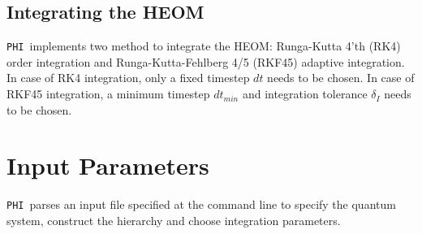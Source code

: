 \documentclass[11pt]{article}
\newcommand{\PHI}{\texttt{PHI}}
\begin{document}
\subsection{Integrating the HEOM}
\PHI\ implements two method to integrate the HEOM: Runga-Kutta 4'th (RK4) order integration and Runga-Kutta-Fehlberg 4/5 (RKF45) adaptive integration. In case of RK4 integration, only a fixed timestep $dt$ needs to be chosen. In case of RKF45 integration, a minimum timestep $dt_{min}$ and integration tolerance $\delta_I$ needs to be chosen.


\section{Input Parameters}
\PHI\ parses an input file specified at the command line to specify the quantum system, construct the hierarchy and choose integration parameters. 
\end{document}
